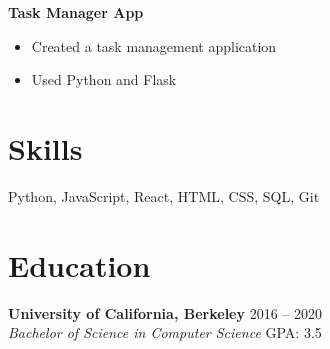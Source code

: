 \documentclass[letterpaper,11pt]{article}
\begin{document}
\textbf{Task Manager App}
\begin{itemize}
    \item Created a task management application
    \item Used Python and Flask
\end{itemize}

\section{Skills}
Python, JavaScript, React, HTML, CSS, SQL, Git

\section{Education}
\textbf{University of California, Berkeley} \hfill 2016 -- 2020 \\
\textit{Bachelor of Science in Computer Science} \hfill GPA: 3.5
\end{document}
